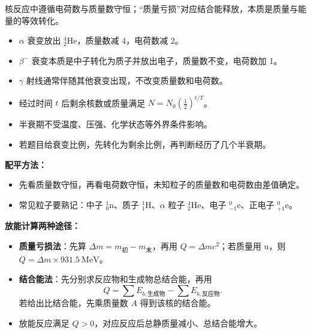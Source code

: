 \begin{keypointbox}
核反应中遵循电荷数与质量数守恒；“质量亏损”对应结合能释放，本质是质量与能量的等效转化。
\end{keypointbox}

\begin{casetypebox}[title={\strut\textcolor{white}{\bfseries 常见题型：自然衰变}}]
\begin{itemize}[leftmargin=1.5em]
  \item $\alpha$ 衰变放出 $^4_2\mathrm{He}$，质量数减 4，电荷数减 2。
  \item $\beta^-$ 衰变本质是中子转化为质子并放出电子，质量数不变，电荷数加 1。
  \item $\gamma$ 射线通常伴随其他衰变出现，不改变质量数和电荷数。
\end{itemize}
\end{casetypebox}

\begin{casetypebox}[title={\strut\textcolor{white}{\bfseries 常见题型：半衰期}}]
\begin{itemize}[leftmargin=1.5em]
  \item 经过时间 $t$ 后剩余核数或质量满足 $N=N_0(\frac12)^{t/T}$。
  \item 半衰期不受温度、压强、化学状态等外界条件影响。
  \item 若题目给衰变比例，先转化为剩余比例，再判断经历了几个半衰期。
\end{itemize}
\end{casetypebox}

\begin{casetypebox}[title={\strut\textcolor{white}{\bfseries 常见题型：核反应方程}}]
\textbf{配平方法：}
\begin{itemize}[leftmargin=1.5em]
  \item 先看质量数守恒，再看电荷数守恒，未知粒子的质量数和电荷数由差值确定。
  \item 常见粒子要熟记：中子 $^1_0\mathrm{n}$、质子 $^1_1\mathrm{H}$、$\alpha$ 粒子 $^4_2\mathrm{He}$、电子 $^0_{-1}\mathrm{e}$、正电子 $^0_{+1}\mathrm{e}$。
\end{itemize}

\textbf{放能计算两种途径：}
\begin{itemize}[leftmargin=1.5em]
  \item \textbf{质量亏损法}：先算 $\Delta m=m_{\text{初}}-m_{\text{末}}$，再用 $Q=\Delta mc^2$；若质量用 $\mathrm{u}$，则 $Q=\Delta m\times 931.5\ \mathrm{MeV}$。
  \item \textbf{结合能法}：先分别求反应物和生成物总结合能，再用
        \[
          Q=\sum E_{b,\text{生成物}}-\sum E_{b,\text{反应物}}.
        \]
        若给出比结合能，先乘质量数 $A$ 得到该核的结合能。
  \item 放能反应满足 $Q>0$，对应反应后总静质量减小、总结合能增大。
\end{itemize}
\end{casetypebox}